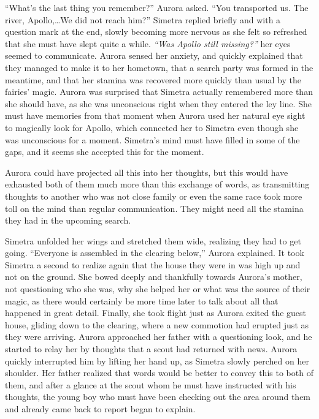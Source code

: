 \enquote{What's the last thing you remember?} Aurora asked. \enquote{You transported us. The river, Apollo,\dots We did not reach him?} Simetra replied briefly and with a question mark at the end, slowly becoming more nervous as she felt so refreshed that she must have slept quite a while. \emph{\enquote{Was Apollo still missing?}} her eyes seemed to communicate. Aurora sensed her anxiety, and quickly explained that they managed to make it to her hometown, that a search party was formed in the meantime, and that her stamina was recovered more quickly than usual by the fairies' magic. Aurora was surprised that Simetra actually remembered more than she should have, as she was unconscious right when they entered the ley line. She must have memories from that moment when Aurora used her natural eye sight to magically look for Apollo, which connected her to Simetra even though she was unconscious for a moment. Simetra's mind must have filled in some of the gaps, and it seems she accepted this for the moment.

Aurora could have projected all this into her thoughts, but this would have exhausted both of them much more than this exchange of words, as transmitting thoughts to another who was not close family or even the same race took more toll on the mind than regular communication. They might need all the stamina they had in the upcoming search.

Simetra unfolded her wings and stretched them wide, realizing they had to get going. \enquote{Everyone is assembled in the clearing below,} Aurora explained. It took Simetra a second to realize again that the house they were in was high up and not on the ground. She bowed deeply and thankfully towards Aurora's mother, not questioning who she was, why she helped her or what was the source of their magic, as there would certainly be more time later to talk about all that happened in great detail. Finally, she took flight just as Aurora exited the guest house, gliding down to the clearing, where a new commotion had erupted just as they were arriving. Aurora approached her father with a questioning look, and he started to relay her by thoughts that a scout had returned with news. Aurora quickly interrupted him by lifting her hand up, as Simetra slowly perched on her shoulder. Her father realized that words would be better to convey this to both of them, and after a glance at the scout whom he must have instructed with his thoughts, the young boy who must have been checking out the area around them and already came back to report began to explain.

